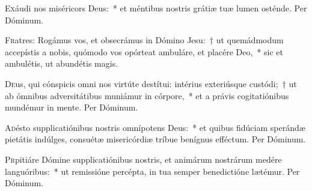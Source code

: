 \documentclass[vesperale_romanum.tex]{subfiles}
\begin{document}
\oratio

\lettrine{E}{x}áudi nos miséricors Deus:~* et méntibus nostris grátiæ tuæ lumen osténde. Per Dóminum.



\lettrine{F}{r}atres: Rogámus vos, et obsecrámus in Dómino Jesu:~† ut quemádmodum accepístis a nobis, quómodo vos opórteat ambuláre, et placére Deo,~* sic et ambulétis, ut abundétis magis.



\oratio

\lettrine{D}{e}us, qui cónspicis omni nos virtúte destítui: intérius exteriúsque custódi;~† ut ab ómnibus adversitátibus muniámur in córpore,~* et a právis cogitatiónibus mundémur in mente. Per Dóminum.






\oratio

\lettrine{A}{d}ésto supplicatiónibus nostris omnípotens Deus:~* et quibus fidúciam sperándæ pietátis indúlges, consuétæ misericórdiæ tríbue benígnus effé\-ctum. Per Dóminum.



\oratio

\lettrine{P}{r}pitiáre Dómine supplicatiónibus nostris, et animárum nostrárum medére languóribus:~* ut remissióne percépta, in tua semper benedictióne lætémur. Per Dóminum.


\end{document}
